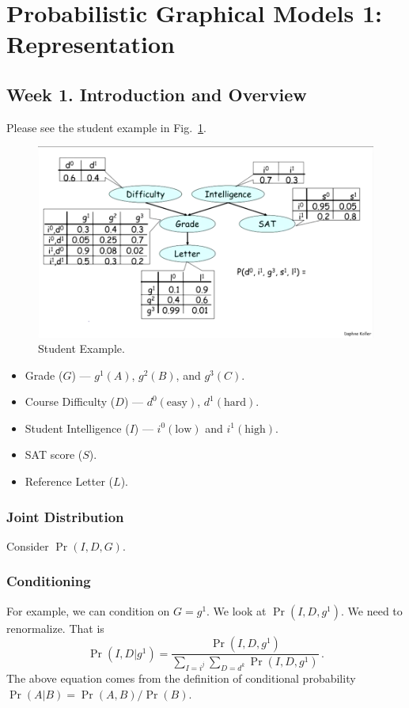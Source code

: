 \documentclass[12pt]{article}
\begin{document}
\section{Probabilistic Graphical Models 1: Representation}

\subsection{Week 1. Introduction and Overview}

Please see the student example in Fig.~\ref{fig:student_example}.

\begin{figure}[H]
\centering
\includegraphics[width=6in]{graphics/student_example.png}
\caption{Student Example.}
\label{fig:student_example}
\end{figure}


\begin{itemize}
    \item Grade ($G$) --- $g^1(A)$, $g^2(B)$, and $g^3(C)$.
    \item Course Difficulty ($D$) --- $d^0(\text{easy})$, $d^1(\text{hard})$.
    \item Student Intelligence ($I$) --- $i^0(\text{low})$ and $i^1(\text{high})$.
    \item SAT score ($S$).
    \item Reference Letter ($L$).
\end{itemize}
 



\subsubsection{Joint Distribution}
Consider $\Pr(I, D, G)$.

\subsubsection{Conditioning}
For example, we can condition on $G=g^1$.  We look at $\Pr(I, D, g^1)$.
We need to renormalize. That is
\begin{equation*}
  \Pr(I, D | g^1) = \frac{\Pr(I, D, g^1)}
                         {\sum_{I=i^j} \sum_{D=d^k} \Pr(I, D, g^1)}  \, .
\end{equation*}
The above equation comes from the definition of conditional probability $\Pr(A | B) = \Pr(A, B) / \Pr(B)$.
\end{document}
